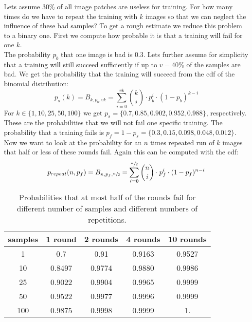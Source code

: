 Lets assume 30\% of all image patches are useless for training. For how many times do we have to repeat the training with $k$ images so that we can neglect the influence of these bad samples? To get a rough estimate we reduce this problem to a binary one. First we compute how probable it is that a training will fail for one $k$.\\
The probability $p_b$ that one image is bad is $0.3$. Lets further assume for simplicity that a training will still succeed sufficiently if up to $v = 40\%$ of the samples are bad. We get the probability that the training will succeed from the \gls{cdf} of the binomial distribution:
\begin{equation}
    p_s(k) = B_{k,p_b, v k} = \sum_{i=0}^{v k} \binom{k}{i}\cdot p_b^i \cdot (1 - p_b)^{k - i}
\end{equation}
For $k\in\{1, 10, 25, 50, 100\}$ we get $p_s = \{\num{0.7},\num{0.85},\num{0.902},\num{0.952},\num{0.988}\}$, respectively. These are the probabilities that we will not fail one specific training. The probability that a training fails is $p_f = 1 - p_s = \{\num{0.3},\num{0.15},\num{0.098},\num{0.048},\num{0.012}\}$. Now we want to look at the probability for an $n$ times repeated run of $k$ images that half or less of these rounds fail. Again this can be computed with the \gls{cdf}:
\begin{equation}
    p_{repeat}(n,p_f) = B_{n,p_f, \sfrac{n}{2}} = \sum_{i=0}^{\sfrac{n}{2}} \binom{n}{i}\cdot p_f^i \cdot (1 - p_f)^{n - i}
\end{equation}

\begin{table}
	\begin{center}
            \begin{tabular}{c|*{4}{c}}
                samples & 1 round & 2 rounds & 4 rounds & 10 rounds \\\hline
                1   & 0.7    &  0.91   &  0.9163 &  0.9527 \\
                10  & 0.8497 &  0.9774 &  0.9880 &  0.9986 \\
                25  & 0.9022 &  0.9904 &  0.9965 &  0.9999  \\
                50  & 0.9522 &  0.9977 &  0.9996 &  0.9999 \\
                100 & 0.9875 &  0.9998 &  0.9999 &  1.
            \end{tabular}
	\end{center}
    \caption{Probabilities that at most half of the rounds fail for different number of samples and different numbers of repetitions.}
    \label{tab:repeated_test_probs}
\end{table}

